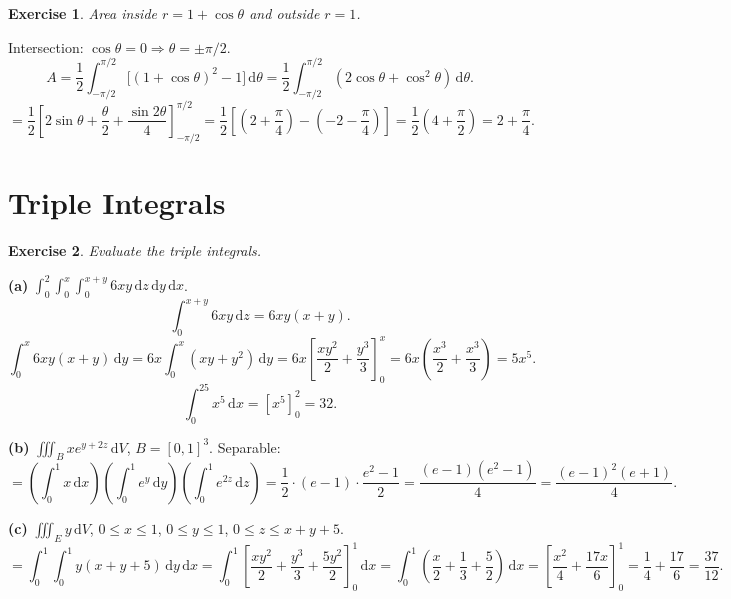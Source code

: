 \documentclass[12pt,a4paper]{article}
\theoremstyle{exstyle}
\newtheorem{exercise}{Exercise}[section]
\newcommand{\dif}[1]{\,\mathrm{d}#1}
\begin{document}
\begin{exercise}
Area inside $r=1+\cos\theta$ and outside $r=1$.
\end{exercise}
\begin{solbox}
Intersection: $\cos\theta=0\Rightarrow\theta=\pm\pi/2$.
\[
  A=\frac{1}{2}\int_{-\pi/2}^{\pi/2}\!\bigl[(1+\cos\theta)^2-1\bigr]\dif{\theta}
  =\frac{1}{2}\int_{-\pi/2}^{\pi/2}(2\cos\theta+\cos^2\!\theta)\dif{\theta}.
\]
\[
  =\frac{1}{2}\left[2\sin\theta+\frac{\theta}{2}+\frac{\sin2\theta}{4}\right]_{-\pi/2}^{\pi/2}
  =\frac{1}{2}\!\left[\left(2+\frac{\pi}{4}\right)-\left(-2-\frac{\pi}{4}\right)\right]
  =\frac{1}{2}\!\left(4+\frac{\pi}{2}\right)=2+\frac{\pi}{4}.
\]
\end{solbox}

\section{Triple Integrals}

\begin{exercise}
Evaluate the triple integrals.
\end{exercise}
\begin{solbox}
\textbf{(a)} $\int_0^2\!\int_0^x\!\int_0^{x+y}6xy\dif{z}\dif{y}\dif{x}$.
\[
  \int_0^{x+y}6xy\dif{z}=6xy(x+y).
\]
\[
  \int_0^x6xy(x+y)\dif{y}=6x\!\int_0^x(xy+y^2)\dif{y}=6x\!\left[\frac{xy^2}{2}+\frac{y^3}{3}\right]_0^x=6x\!\left(\frac{x^3}{2}+\frac{x^3}{3}\right)=5x^5.
\]
\[
  \int_0^25x^5\dif{x}=\left[x^5\right]_0^2=32.
\]

\textbf{(b)} $\iiint_B xe^{y+2z}\dif{V}$, $B=[0,1]^3$. Separable:
\[
  =\left(\int_0^1 x\dif{x}\right)\!\left(\int_0^1 e^y\dif{y}\right)\!\left(\int_0^1 e^{2z}\dif{z}\right)
  =\frac{1}{2}\cdot(e-1)\cdot\frac{e^2-1}{2}=\frac{(e-1)(e^2-1)}{4}=\frac{(e-1)^2(e+1)}{4}.
\]

\textbf{(c)} $\iiint_E y\dif{V}$, $0\le x\le1$, $0\le y\le1$, $0\le z\le x+y+5$.
\[
  =\int_0^1\!\int_0^1 y(x+y+5)\dif{y}\dif{x}
  =\int_0^1\!\left[\frac{xy^2}{2}+\frac{y^3}{3}+\frac{5y^2}{2}\right]_0^1\dif{x}
  =\int_0^1\!\left(\frac{x}{2}+\frac{1}{3}+\frac{5}{2}\right)\dif{x}
  =\left[\frac{x^2}{4}+\frac{17x}{6}\right]_0^1=\frac{1}{4}+\frac{17}{6}=\frac{37}{12}.
\]
\end{solbox}
\end{document}
